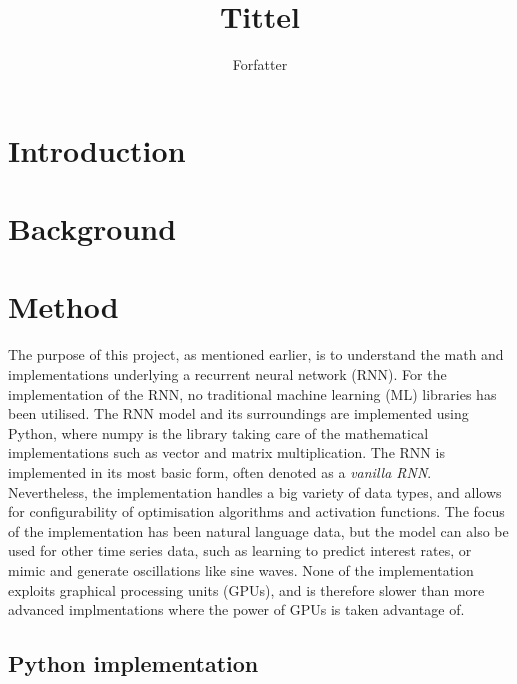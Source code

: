 \documentclass[12pt]{article}
\title{Tittel}
\author{Forfatter}
\date{}
\begin{document}
\maketitle

\section{Introduction}


\section{Background}


\section{Method}
The purpose of this project, as mentioned earlier, is to understand the math and implementations underlying a recurrent neural network (RNN). For the implementation of the RNN, no traditional machine learning (ML) libraries has been utilised. The RNN model and its surroundings are implemented using Python, where numpy \cite{NUMPY} is the library taking care of the mathematical implementations such as vector and matrix multiplication. The RNN is implemented in its most basic form, often denoted as a \textit{vanilla RNN}. Nevertheless, the implementation handles a big variety of data types, and allows for configurability of optimisation algorithms and activation functions. The focus of the implementation has been natural language data, but the model can also be used for other time series data, such as learning to predict interest rates, or mimic and generate oscillations like sine waves. None of the implementation exploits graphical processing units (GPUs), and is therefore slower than more advanced implmentations where the power of GPUs is taken advantage of.


\subsection{Python implementation}
\end{document}
